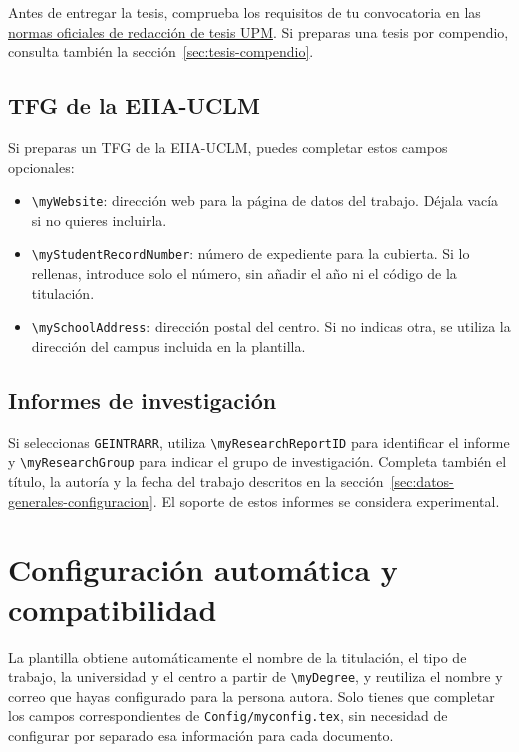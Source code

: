 Antes de entregar la tesis, comprueba los requisitos de tu convocatoria en las \href{https://www.upm.es/Estudiantes/Estudios_Titulaciones/Estudios_Doctorado/Tesis/NormasRedaccionTesis}{normas oficiales de redacción de tesis UPM}. Si preparas una tesis por compendio, consulta también la sección~\ref{sec:tesis-compendio}.

\subsection{TFG de la EIIA-UCLM}
\label{sec:configuracion-tfg-eiia-uclm}

Si preparas un TFG de la EIIA-UCLM, puedes completar estos campos opcionales:

\begin{itemize}
  \item \texttt{\textbackslash{}myWebsite}: dirección web para la página de datos del trabajo. Déjala vacía si no quieres incluirla.
  \item \texttt{\textbackslash{}myStudentRecordNumber}: número de expediente para la cubierta. Si lo rellenas, introduce solo el número, sin añadir el año ni el código de la titulación.
  \item \texttt{\textbackslash{}mySchoolAddress}: dirección postal del centro. Si no indicas otra, se utiliza la dirección del campus incluida en la plantilla.
\end{itemize}

\subsection{Informes de investigación}
\label{sec:configuracion-informes}

Si seleccionas \texttt{GEINTRARR}, utiliza \texttt{\textbackslash{}myResearchReportID} para identificar el informe y \texttt{\textbackslash{}myResearchGroup} para indicar el grupo de investigación. Completa también el título, la autoría y la fecha del trabajo descritos en la sección~\ref{sec:datos-generales-configuracion}. El soporte de estos informes se considera experimental.

\section{Configuración automática y compatibilidad}

La plantilla obtiene automáticamente el nombre de la titulación, el tipo de trabajo, la universidad y el centro a partir de \texttt{\textbackslash{}myDegree}, y reutiliza el nombre y correo que hayas configurado para la persona autora. Solo tienes que completar los campos correspondientes de \texttt{Config/myconfig.tex}, sin necesidad de configurar por separado esa información para cada documento.

